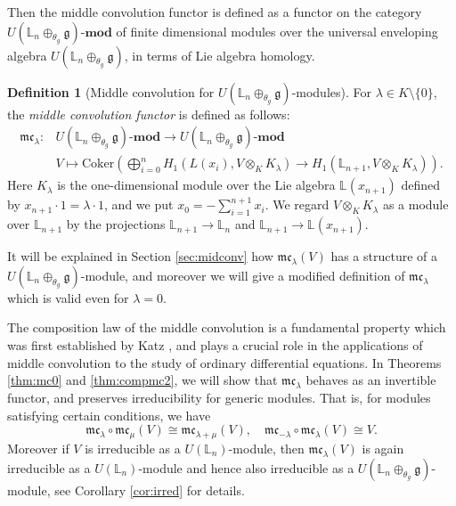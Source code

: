 \documentclass[a4paper,12pt]{article}
\theoremstyle{definition}
\newtheorem{df}[thm]{Definition}
\theoremstyle{remark}
\begin{document}
Then the middle convolution functor is defined as a functor on the category 
$U(\mathbb{L}_{n}\oplus_{\theta_{g}} \mathfrak{g})\text{-}\mathbf{mod}$
of finite dimensional modules over the universal enveloping algebra $U(\mathbb{L}_{n}\oplus_{\theta_{g}} \mathfrak{g})$,
in terms of Lie algebra homology.
\begin{df}[Middle convolution for $U(\mathbb{L}_{n}\oplus_{\theta_{g}} \mathfrak{g})$-modules]\label{df:liemc0}
	For $\lambda\in K\setminus\{0\}$,
	the \emph{middle convolution functor} is defined as follows: 
	\begin{align*}
	\mathfrak{mc}_{\lambda}\colon& U(\mathbb{L}_{n}\oplus_{\theta_{g}} \mathfrak{g})\text{-}\mathbf{mod}\longrightarrow 
	U(\mathbb{L}_{n}\oplus_{\theta_{g}} \mathfrak{g})\text{-}\mathbf{mod}\\
	& V\longmapsto 
	\mathrm{Coker}\left(
		\bigoplus_{i=0}^{n}H_{1}(L(x_{i}),V\otimes_{K}K_{\lambda})
		\to H_{1}(\mathbb{L}_{n+1},V\otimes_{K}K_{\lambda}) 
	\right).
	\end{align*}
	Here $K_{\lambda}$
is the one-dimensional module over the Lie algebra $\mathbb{L}(x_{n+1})$ defined by $x_{n+1}\cdot 1=\lambda\cdot 1$,
and we put $x_{0}=-\sum_{i=1}^{n+1} x_i$.
We regard $V\otimes_{K}K_{\lambda}$ as a module over $\mathbb{L}_{n+1}$
by the projections $\mathbb{L}_{n+1}\rightarrow \mathbb{L}_{n}$ and 
$\mathbb{L}_{n+1}\to \mathbb{L}(x_{n+1})$.
\end{df}
It will be explained in Section \ref{sec:midconv} 
how $\mathfrak{mc}_{\lambda}(V)$
has a structure of a $U(\mathbb{L}_{n}\oplus_{\theta_{g}} \mathfrak{g})$-module, and 
moreover
we will give a modified definition of $\mathfrak{mc}_{\lambda}$
which is valid even for $\lambda=0$.

The composition law of the middle convolution is a fundamental 
property which was first established by Katz \cite{Katz},
and plays a crucial role in the applications of middle convolution to the study of ordinary differential equations.
In Theorems \ref{thm:mc0} and \ref{thm:compmc2}, we will show that $\mathfrak{mc}_{\lambda}$ 
behaves as an invertible functor, 
and preserves irreducibility for generic modules. 
That is, for modules satisfying certain conditions, we have
\[
	\mathfrak{mc}_{\lambda}\circ\mathfrak{mc}_{\mu}(V)\cong \mathfrak{mc}_{\lambda+\mu}(V),\quad \mathfrak{mc}_{-\lambda}\circ\mathfrak{mc}_{\lambda}(V)\cong V.
\]
Moreover if $V$ is irreducible as a $U(\mathbb{L}_{n})$-module, then $\mathfrak{mc}_{\lambda}(V)$ is again irreducible as a $U(\mathbb{L}_{n})$-module and hence also irreducible as a $U(\mathbb{L}_{n}\oplus_{\theta_{g}}\mathfrak{g})$-module,
see Corollary \ref{cor:irred} for details.
\end{document}
